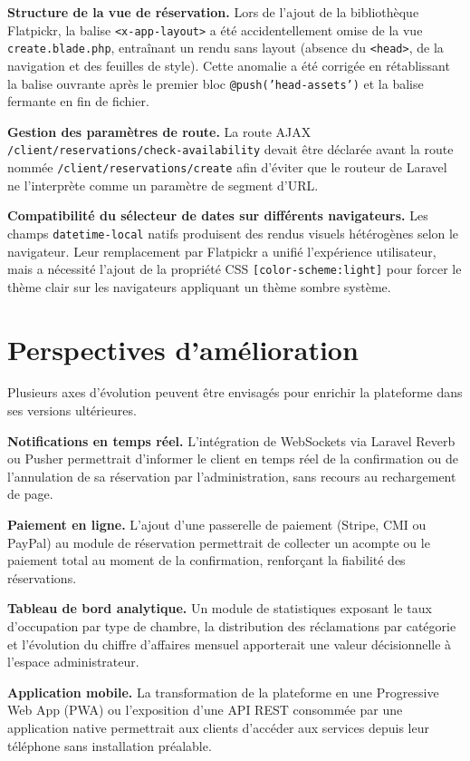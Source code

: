 \documentclass[12pt,a4paper]{report}
\begin{document}
\textbf{Structure de la vue de réservation.} Lors de l'ajout de la
bibliothèque Flatpickr, la balise \texttt{<x-app-layout>} a été
accidentellement omise de la vue \texttt{create.blade.php}, entraînant un
rendu sans layout (absence du \texttt{<head>}, de la navigation et des
feuilles de style). Cette anomalie a été corrigée en rétablissant la
balise ouvrante après le premier bloc \texttt{@push('head-assets')} et la
balise fermante en fin de fichier.

\textbf{Gestion des paramètres de route.} La route AJAX
\texttt{/client/reservations/check-availability} devait être déclarée avant
la route nommée \texttt{/client/reservations/create} afin d'éviter que le
routeur de Laravel ne l'interprète comme un paramètre de segment d'URL.

\textbf{Compatibilité du sélecteur de dates sur différents navigateurs.}
Les champs \texttt{datetime-local} natifs produisent des rendus visuels
hétérogènes selon le navigateur. Leur remplacement par Flatpickr a unifié
l'expérience utilisateur, mais a nécessité l'ajout de la propriété CSS
\texttt{[color-scheme:light]} pour forcer le thème clair sur les navigateurs
appliquant un thème sombre système.

\section{Perspectives d'amélioration}

Plusieurs axes d'évolution peuvent être envisagés pour enrichir la
plateforme dans ses versions ultérieures.

\textbf{Notifications en temps réel.} L'intégration de WebSockets via
Laravel Reverb ou Pusher permettrait d'informer le client en temps réel
de la confirmation ou de l'annulation de sa réservation par
l'administration, sans recours au rechargement de page.

\textbf{Paiement en ligne.} L'ajout d'une passerelle de paiement (Stripe,
CMI ou PayPal) au module de réservation permettrait de collecter un acompte
ou le paiement total au moment de la confirmation, renforçant la fiabilité
des réservations.

\textbf{Tableau de bord analytique.} Un module de statistiques exposant
le taux d'occupation par type de chambre, la distribution des réclamations
par catégorie et l'évolution du chiffre d'affaires mensuel apporterait une
valeur décisionnelle à l'espace administrateur.

\textbf{Application mobile.} La transformation de la plateforme en une
Progressive Web App (PWA) ou l'exposition d'une API REST consommée par une
application native permettrait aux clients d'accéder aux services depuis
leur téléphone sans installation préalable.
\end{document}
